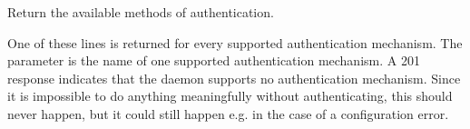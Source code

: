 
\begin{reqdesc}
  Return the available methods of authentication.
\end{reqdesc}

\noperm

\begin{responses}
  One of these lines is returned for every supported authentication
  mechanism. The  parameter is the name of one supported
  authentication mechanism.
  A 201 response indicates that the daemon supports no authentication
  mechanism. Since it is impossible to do anything meaningfully
  without authenticating, this should never happen, but it could still
  happen e.g. in the case of a configuration error.
\end{responses}
